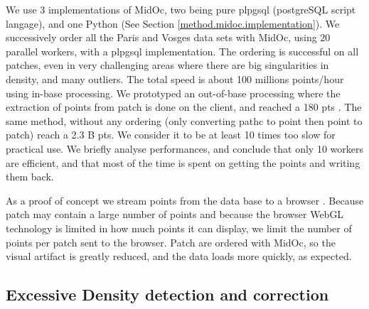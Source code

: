 		
		We use 3 implementations of MidOc, two being pure plpgsql (postgreSQL script langage), and one Python (See Section \ref{method.midoc.implementation}).
		We successively order all the Paris and Vosges data sets with MidOc, using 20 parallel workers, with a plpgsql implementation.
		The ordering is successful on all patches, even in very challenging areas where there are big singularities in density, and many outliers.
		The total speed is about 100 millions points/hour using in-base processing.
		We prototyped an out-of-base processing where the extraction of points from patch is done on the client, and reached a 180 \mega pts \per \hour.
		The same method, without any ordering (only converting pathc to point then point to patch) reach a 2.3 B pts\per\hour.
		We consider it to be at least 10 times too slow for practical use.
		We briefly analyse performances, and conclude that only 10 workers are efficient, and that most of the time is spent on getting the points and writing them back.
		
		 
		As a proof of concept we stream points from the data base to a browser \cite{IGN2014a}. Because patch may contain a large number of points and because the browser WebGL technology is limited in how much points it can display,
		we limit the number of points per patch sent to the browser. Patch are ordered with MidOc, so the visual artifact is greatly reduced, and the data loads more quickly, as expected. 


	\subsection{Excessive Density detection and correction} 
		
